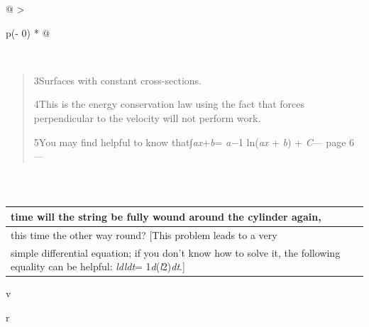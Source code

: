 \documentclass[
]{article}
\begin{document}
\begin{longtable}[]{@{}l@{}}
\toprule
\endhead
 \\
\bottomrule
\end{longtable}

\begin{longtable}[]{@{}l@{}}
\toprule
\endhead
 \\
\bottomrule
\end{longtable}

\begin{longtable}[]{@{}l@{}}
\toprule
\endhead
 \\
\bottomrule
\end{longtable}

\begin{longtable}[]{@{}
  >{\raggedright\arraybackslash}p{(\columnwidth - 0\tabcolsep) * }@{}}
\toprule
 \\
\midrule
\endhead
\begin{minipage}[t]{\linewidth}\raggedright
\begin{quote}
3Surfaces with constant cross-sections.

4This is the energy conservation law using the fact that forces
perpendicular to the velocity will not perform work.

5You may ﬁnd helpful to know that∫\emph{ax}+\emph{b}= \emph{a−}1
ln(\emph{ax} + \emph{b}) + \emph{C}--- page 6 ---
\end{quote}
\end{minipage} \\
\bottomrule
\end{longtable}

\begin{longtable}[]{@{}l@{}}
\toprule
\endhead
 \\
\bottomrule
\end{longtable}

\begin{longtable}[]{@{}l@{}}
\toprule
time will the string be fully wound around the cylinder again, \\
\midrule
\endhead
this time the other way round? {[}This problem leads to a very \\
simple diﬀerential equation; if you don't know how to solve it, the
following equality can be helpful: \emph{ldldt}=
1\emph{d}(\emph{l}2)\emph{dt}.{]} \\
\bottomrule
\end{longtable}

v

r
\end{document}
